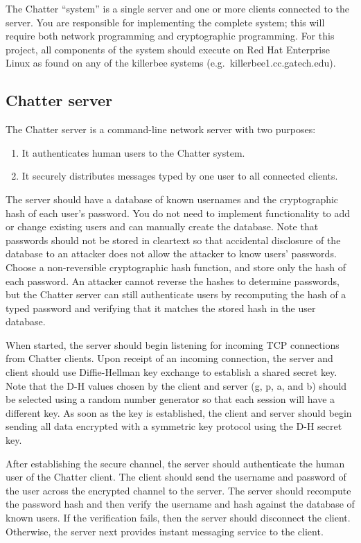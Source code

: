\documentclass[letterpaper]{article}
\begin{document}
The Chatter ``system'' is a single server and one or more clients connected to the
server. You are responsible for implementing the complete system; this will require
both network programming and cryptographic programming. For this project, all
components of the system should execute on Red Hat Enterprise Linux as found on
any of the killerbee systems (e.g.\ killerbee1.cc.gatech.edu).

\subsection*{Chatter server}

The Chatter server is a command-line network server with two purposes:
\begin{enumerate}
\item It authenticates human users to the Chatter system.
\item It securely distributes messages typed by one user to all connected clients.
\end{enumerate}

The server should have a database of known usernames and the cryptographic hash
of each user’s password. You do not need to implement functionality to add or
change existing users and can manually create the database. Note that passwords
should not be stored in cleartext so that accidental disclosure of the database to an
attacker does not allow the attacker to know users’ passwords. Choose a non-reversible
cryptographic hash function, and store only the hash of each password.
An attacker cannot reverse the hashes to determine passwords, but the Chatter
server can still authenticate users by recomputing the hash of a typed password and
verifying that it matches the stored hash in the user database.

When started, the server should begin listening for incoming TCP connections from
Chatter clients. Upon receipt of an incoming connection, the server and client should
use Diffie-Hellman key exchange to establish a shared secret key. Note that the D-H
values chosen by the client and server (g, p, a, and b) should be selected using a
random number generator so that each session will have a different key. As soon as
the key is established, the client and server should begin sending all data encrypted
with a symmetric key protocol using the D-H secret key.

After establishing the secure channel, the server should authenticate the human
user of the Chatter client. The client should send the username and password of the
user across the encrypted channel to the server. The server should recompute the
password hash and then verify the username and hash against the database of
known users. If the verification fails, then the server should disconnect the client.
Otherwise, the server next provides instant messaging service to the client.
\end{document}
